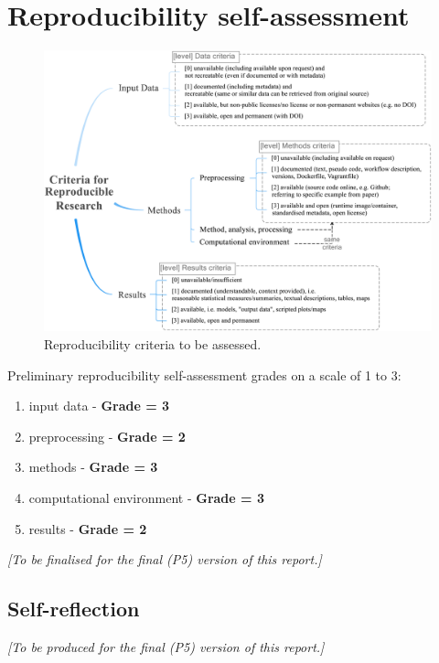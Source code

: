 
\chapter{Reproducibility self-assessment}

\begin{figure}[h]
  \centering
  \includegraphics[width=0.9\linewidth]{figs/reproducibility_criteria.png}
  \caption{Reproducibility criteria to be assessed.}
\label{fig:reproducibility_criteria}
\end{figure}


Preliminary reproducibility self-assessment grades on a scale of 1 to 3:

\begin{enumerate}
  \item input data - \textbf{Grade = 3}
  \item preprocessing - \textbf{Grade = 2}
  \item methods - \textbf{Grade = 3}
  \item computational environment - \textbf{Grade = 3}
  \item results - \textbf{Grade = 2}
\end{enumerate}

\textit{[To be finalised for the final (P5) version of this report.]}

\section{Self-reflection} 

\textit{[To be produced for the final (P5) version of this report.]}